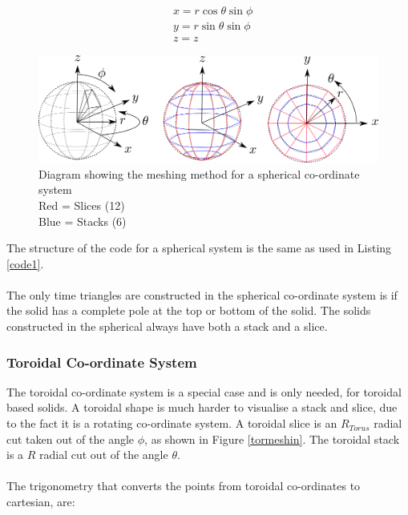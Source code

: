 \documentclass[12pt,a4paper]{article}
\begin{document}
\begin{equation}
\begin{aligned}
& x = r \cos{\theta}\sin{\phi}\\
& y = r \sin{\theta}\sin{\phi} \\
& z = z
\end{aligned}
\label{trigsph}
\end{equation}
\begin{figure}[h!]
\centering
\includegraphics[scale=0.5]{Images//Coords//sph.png}
\caption[width=\columnwidth]{Diagram showing the meshing method for a spherical co-ordinate system\\
Red = Slices (12)\\
Blue = Stacks (6)}
\label{sphmeshin}
\end{figure}

\noindent The structure of the code for a spherical system is the same as used in Listing \ref{code1}.\\\\
\noindent The only time triangles are constructed in the spherical co-ordinate system is if the solid has a complete pole at the top or bottom of the solid. The solids constructed in the spherical always have both a stack and a slice.

%

\newpage
\subsubsection{Toroidal Co-ordinate System}

The toroidal co-ordinate system is a special case and is only needed, for toroidal based solids. A toroidal shape is much harder to visualise a stack and slice, due to the fact it is a rotating co-ordinate system. A toroidal slice is an $R_{Torus}$ radial cut taken out of the angle $\phi$, as shown in Figure \ref{tormeshin}. The toroidal stack is a $R$ radial cut out of the angle $\theta$. 
\\\\
The trigonometry that converts the points from toroidal co-ordinates to cartesian, are:
\end{document}
